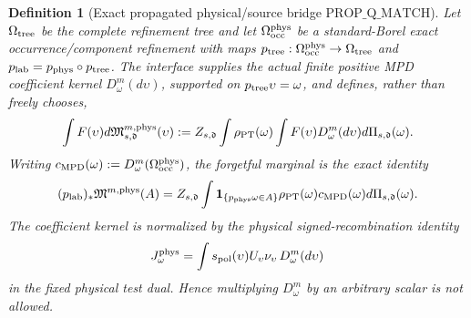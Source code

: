 \documentclass[11pt]{article}
\newtheorem{definition}[theorem]{Definition}
\newcommand{\one}{\mathbf 1}
\begin{document}
\begin{definition}[Exact propagated physical/source bridge
$\mathrm{PROP\_Q\_MATCH}$]
\label{def:propagated-q-match}
Let $\Omega_{\rm tree}$ be the complete refinement tree and let
$\Omega_{\rm occ}^{\rm phys}$ be a standard-Borel exact
occurrence/component refinement with maps
$p_{\rm tree}:\Omega_{\rm occ}^{\rm phys}\to\Omega_{\rm tree}$ and
$p_{\rm lab}=p_{\rm phys}\circ p_{\rm tree}$.  The interface supplies the
actual finite positive MPD coefficient kernel
$D_\omega^m(d\upsilon)$, supported on
$p_{\rm tree}\upsilon=\omega$, and defines, rather than freely chooses,
\begin{equation}
\label{eq:physical-occurrence-m-measure}
 \int F(\upsilon)d\mathfrak M_{s,\mathfrak d}^{m,\rm phys}(\upsilon)
 :=Z_{s,\mathfrak d}\int \rho_{\rm PT}(\omega)
       \int F(\upsilon)D_\omega^m(d\upsilon)
       d\Pi_{s,\mathfrak d}(\omega).
\end{equation}
Writing $c_{\rm MPD}(\omega):=D_\omega^m(\Omega_{\rm occ}^{\rm phys})$,
the forgetful marginal is the exact identity
\begin{equation}
\label{eq:physical-occurrence-forgetful-marginal}
 (p_{\rm lab})_*\mathfrak M^{m,\rm phys}(A)
 =Z_{s,\mathfrak d}\int\one_{\{p_{\rm phys}\omega\in A\}}
   \rho_{\rm PT}(\omega)c_{\rm MPD}(\omega)d\Pi_{s,\mathfrak d}(\omega).
\end{equation}
The coefficient kernel is normalized by the physical signed-recombination
identity
\begin{equation}
\label{eq:physical-occurrence-signed-recombination}
 J_\omega^{\rm phys}
 =\int s_{\rm pol}(\upsilon)
       U_\upsilon\nu_\upsilon\,D_\omega^m(d\upsilon)
\end{equation}
in the fixed physical test dual.  Hence multiplying
$D_\omega^m$ by an arbitrary scalar is not allowed.


\end{definition}
\end{document}
